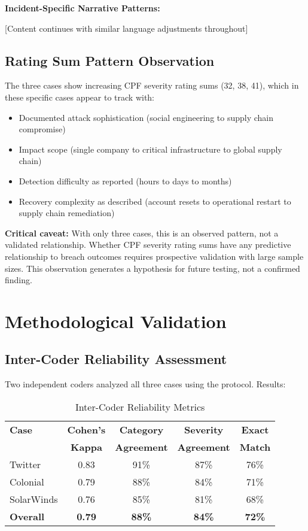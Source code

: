 \documentclass[11pt,a4paper]{article}
\begin{document}
\textbf{Incident-Specific Narrative Patterns:}

[Content continues with similar language adjustments throughout]

\subsection{Rating Sum Pattern Observation}

The three cases show increasing CPF severity rating sums (32, 38, 41), which in these specific cases appear to track with:

\begin{itemize}
\item Documented attack sophistication (social engineering to supply chain compromise)
\item Impact scope (single company to critical infrastructure to global supply chain)
\item Detection difficulty as reported (hours to days to months)
\item Recovery complexity as described (account resets to operational restart to supply chain remediation)
\end{itemize}

\textbf{Critical caveat:} With only three cases, this is an observed pattern, not a validated relationship. Whether CPF severity rating sums have any predictive relationship to breach outcomes requires prospective validation with large sample sizes. This observation generates a hypothesis for future testing, not a confirmed finding.

\section{Methodological Validation}

\subsection{Inter-Coder Reliability Assessment}

Two independent coders analyzed all three cases using the protocol. Results:

\begin{table}[ht]
\centering
\caption{Inter-Coder Reliability Metrics}
\label{tab:reliability}
\begin{tabular}{lcccc}
\toprule
\textbf{Case} & \textbf{Cohen's} & \textbf{Category} & \textbf{Severity} & \textbf{Exact} \\
 & \textbf{Kappa} & \textbf{Agreement} & \textbf{Agreement} & \textbf{Match} \\
\midrule
Twitter & 0.83 & 91\% & 87\% & 76\% \\
Colonial & 0.79 & 88\% & 84\% & 71\% \\
SolarWinds & 0.76 & 85\% & 81\% & 68\% \\
\midrule
\textbf{Overall} & \textbf{0.79} & \textbf{88\%} & \textbf{84\%} & \textbf{72\%} \\
\bottomrule
\end{tabular}
\end{table}
\end{document}
